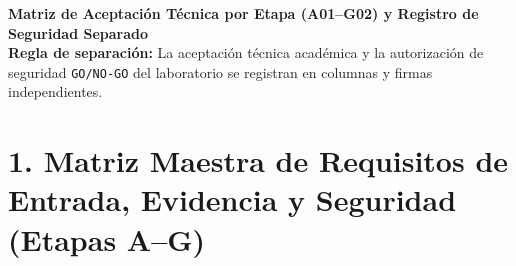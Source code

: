 \documentclass[10pt, a4paper, landscape]{article}
\begin{document}
\begin{center}
    \Large\textbf{\textcolor{ucbblue}{Matriz de Aceptación Técnica por Etapa (A01–G02) y Registro de Seguridad Separado}}\\[0.1cm]
    \footnotesize\textbf{Regla de separación:} La aceptación técnica académica y la autorización de seguridad \texttt{GO/NO-GO} del laboratorio se registran en columnas y firmas independientes.
\end{center}

\section*{1. Matriz Maestra de Requisitos de Entrada, Evidencia y Seguridad (Etapas A–G)}

\begingroup
\scriptsize
\setlength{\tabcolsep}{3.5pt}
\renewcommand{\arraystretch}{1.35}
\end{document}
